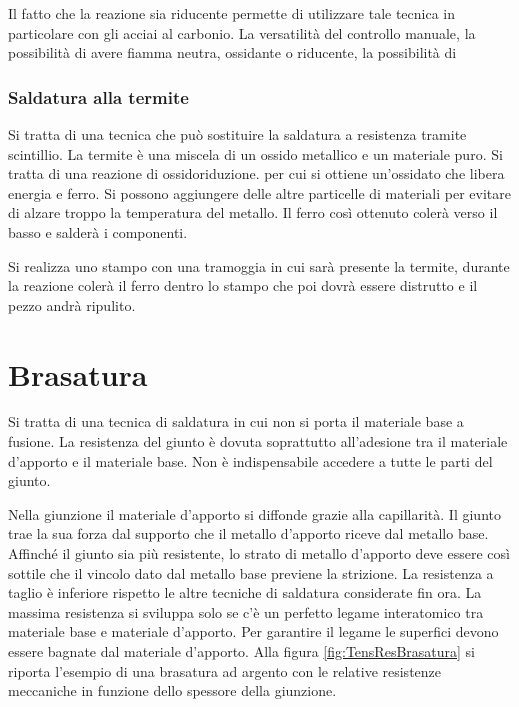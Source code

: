 Il fatto che la reazione sia riducente permette di utilizzare tale tecnica in particolare con gli acciai al carbonio.
La versatilità del controllo manuale, la possibilità di avere fiamma neutra, ossidante o riducente, la possibilità di \moretodo{\\aggiungi}



\subsection{Saldatura alla termite}
Si tratta di una tecnica che può sostituire la saldatura a resistenza tramite scintillio.
La termite è una miscela di un ossido metallico e un materiale puro.
Si tratta di una reazione di ossidoriduzione. per cui si ottiene un'ossidato che libera energia e ferro. Si possono aggiungere delle altre particelle di materiali per evitare di alzare troppo la temperatura del metallo.
Il ferro così ottenuto colerà verso il basso e salderà i componenti.

Si realizza uno stampo con una tramoggia in cui sarà presente la termite, durante la reazione colerà il ferro dentro lo stampo che poi dovrà essere distrutto e il pezzo andrà ripulito.

\chapter{Brasatura}
Si tratta di una tecnica di saldatura in cui non si porta il materiale base a fusione. La resistenza del giunto è dovuta soprattutto all'adesione tra il materiale d'apporto e il materiale base.
Non è indispensabile accedere a tutte le parti del giunto.

Nella giunzione il materiale d'apporto si diffonde grazie alla capillarità.
Il giunto trae la sua forza dal supporto che il metallo d'apporto riceve dal metallo base.
Affinché il giunto sia più resistente, lo strato di metallo d'apporto deve essere così sottile che il vincolo dato dal metallo base previene la strizione.
La resistenza a taglio è inferiore rispetto le altre tecniche di saldatura considerate fin ora.
La massima resistenza si sviluppa solo se c'è un perfetto legame interatomico tra materiale base e materiale d'apporto.
Per garantire il legame le superfici devono essere bagnate dal materiale d'apporto.
Alla figura \ref{fig:TensResBrasatura} si riporta l'esempio di una brasatura ad argento con le relative resistenze meccaniche in funzione dello spessore della giunzione.

